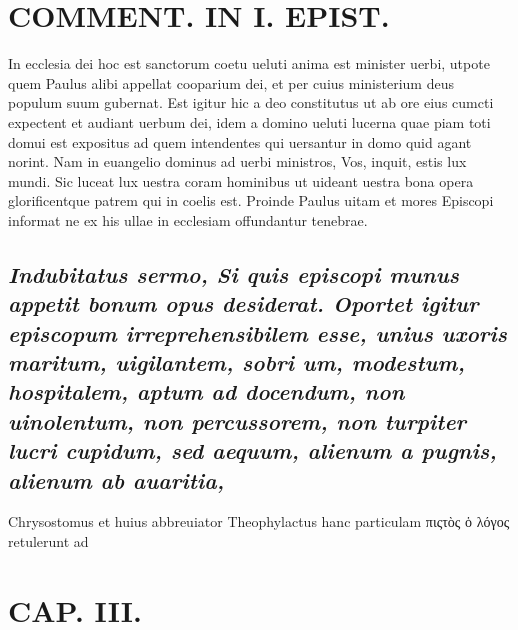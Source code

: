 \documentclass{article}
\begin{document}
\begin{pages}
\section*{COMMENT. IN I. EPIST. }\pstart In ecclesia dei hoc est sanctorum coetu ueluti anima est minister uerbi, utpote quem Paulus alibi appellat cooparium dei, et per cuius ministerium deus populum suum gubernat. Est igitur hic a deo constitutus ut ab ore eius cumcti expectent et audiant uerbum dei, idem a domino ueluti lucerna quae piam toti domui est expositus ad quem intendentes qui uersantur in domo quid agant norint. Nam in euangelio dominus ad uerbi ministros, Vos, inquit, estis lux mundi. Sic luceat lux uestra coram hominibus ut uideant uestra bona opera glorificentque patrem qui in coelis est. Proinde Paulus uitam et mores Episcopi informat ne ex his ullae in ecclesiam offundantur tenebrae.  \pend 
{}
{}
\subsection*{\textit{Indubitatus sermo, Si quis episcopi munus appetit bonum opus desiderat. Oportet igitur episcopum irreprehensibilem esse, unius uxoris maritum, uigilantem, sobri um, modestum, hospitalem, aptum ad docendum, non uinolentum, non percussorem, non turpiter lucri cupidum, sed aequum, alienum a pugnis, alienum ab auaritia, }}\pstart Chrysostomus et huius abbreuiator Theophylactus hanc particulam πιςτὸς ὁ λόγος retulerunt ad  \pend
\endnumbering
\beginnumbering
\section{CAP. III. }
\pstart
\pend
\endnumbering
\end{pages}
\end{document}
